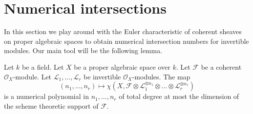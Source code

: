 \section{Numerical intersections}
\label{section-num}

\noindent
In this section we play around with the Euler characteristic of
coherent sheaves on proper algebraic spaces to obtain numerical intersection
numbers for invertible modules. Our main tool will be the following
lemma.

\begin{lemma}
\label{lemma-numerical-polynomial-from-euler}
Let $k$ be a field. Let $X$ be a proper algebraic space over $k$.
Let $\mathcal{F}$ be a coherent $\mathcal{O}_X$-module. Let
$\mathcal{L}_1, \ldots, \mathcal{L}_r$ be invertible $\mathcal{O}_X$-modules.
The map
$$
(n_1, \ldots, n_r) \longmapsto
\chi(X, \mathcal{F} \otimes
\mathcal{L}_1^{\otimes n_1} \otimes \ldots \otimes
\mathcal{L}_r^{\otimes n_r})
$$
is a numerical polynomial in $n_1, \ldots, n_r$ of total degree at
most the dimension of the scheme theoretic support of $\mathcal{F}$.
\end{lemma}

